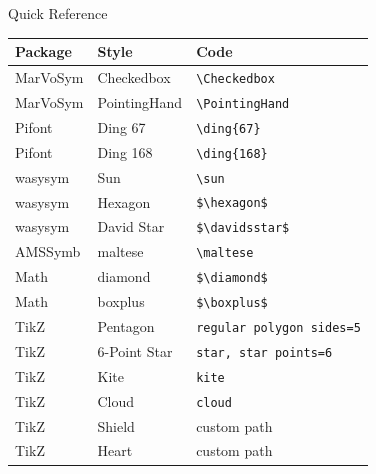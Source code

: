 \documentclass[10pt]{beamer}
\begin{document}
\begin{frame}{Quick Reference}
\centering
\scriptsize
\begin{tabular}{l l l}
\toprule
\textbf{Package} & \textbf{Style} & \textbf{Code} \\
\midrule
MarVoSym & Checkedbox & \texttt{\textbackslash Checkedbox} \\
MarVoSym & PointingHand & \texttt{\textbackslash PointingHand} \\
Pifont & Ding 67 & \texttt{\textbackslash ding\{67\}} \\
Pifont & Ding 168 & \texttt{\textbackslash ding\{168\}} \\
wasysym & Sun & \texttt{\textbackslash sun} \\
wasysym & Hexagon & \texttt{\$\textbackslash hexagon\$} \\
wasysym & David Star & \texttt{\$\textbackslash davidsstar\$} \\
AMSSymb & maltese & \texttt{\textbackslash maltese} \\
Math & diamond & \texttt{\$\textbackslash diamond\$} \\
Math & boxplus & \texttt{\$\textbackslash boxplus\$} \\
TikZ & Pentagon & \texttt{regular polygon sides=5} \\
TikZ & 6-Point Star & \texttt{star, star points=6} \\
TikZ & Kite & \texttt{kite} \\
TikZ & Cloud & \texttt{cloud} \\
TikZ & Shield & custom path \\
TikZ & Heart & custom path \\
\bottomrule
\end{tabular}
\end{frame}
\end{document}
